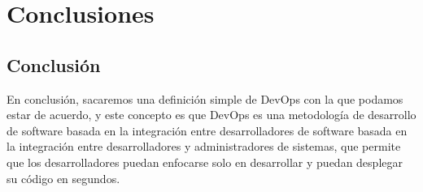 \documentclass[preprint,12pt]{elsarticle}
\begin{document}


\section{Conclusiones}
\subsection{Conclusión }	
En conclusión, sacaremos una definición simple de DevOps con la que podamos estar de acuerdo, y este concepto es que DevOps es una metodología de desarrollo de software basada en la integración entre desarrolladores de software basada en la integración entre desarrolladores y administradores de sistemas, que permite que los desarrolladores puedan enfocarse solo en desarrollar y puedan desplegar su código en segundos.


	
	

	
	\newpage
	
		 
\citep{DLake01}  
\citep{DLake02}  
\citep{DWarehouse01}  
\citep{DWarehouse02}   
	
\end{document}
